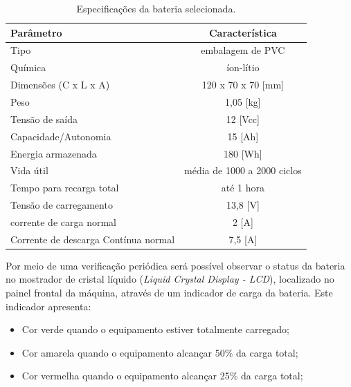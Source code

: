 \begin{table}[H]
    \centering
    \footnotesize
    \caption{Especificações da bateria selecionada.}
    \label{Energia_bateria}
    \begin{adjustbox}{max width = \textwidth}
        \begin{tabular}{|l|c|}
            \hline
            \rowcolor[HTML]{A8DADC}
            Parâmetro & Característica
            \\ \hline
            Tipo & embalagem de PVC
            \\ \hline
            Química & íon-lítio
            \\ \hline
Dimensões  (C x L x A) & 120 x 70 x 70 [mm]
\\ \hline
 Peso & 1,05 [kg]
 \\ \hline
 Tensão de saída & 12 [Vcc]
 \\ \hline
 Capacidade/Autonomia & 15 [Ah]
 \\ \hline
 Energia armazenada & 180 [Wh]
 \\ \hline
 Vida útil & média de 1000 a 2000 ciclos
 \\ \hline
 Tempo para recarga total & até 1 hora
 \\ \hline
             Tensão de carregamento &  13,8 [V]
             \\ \hline
             corrente de carga normal & 2 [A] 
             \\ \hline
             Corrente de descarga Contínua normal & 7,5 [A]
            \\ \hline
        \end{tabular}
    \end{adjustbox}
\end{table} 

Por meio de uma verificação periódica será possível observar o status da bateria no mostrador de cristal líquido (\textit{Liquid Crystal Display - LCD}), localizado no painel frontal da máquina, através de um indicador de carga da bateria. Este indicador apresenta:
 
 \begin{itemize}
     \item Cor verde quando o equipamento estiver totalmente carregado;
     
     \item Cor amarela quando o equipamento alcançar 50\% da carga total;
     
     \item Cor vermelha quando o equipamento alcançar 25\% da carga total;
 \end{itemize}

